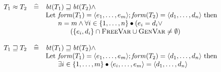 \[
\begin{array}{rcl}
T_1 \approx T_2 & \widehat{=} 
   & \bt(T_1) \sqsupseteq \bt(T_2) \wedge\\
 & & \mathrm{Let}\ \form(T_1) = \langle e_1,\ldots,e_m\rangle;
 \form(T_2) = \langle d_1,\ldots,d_n\rangle\ \mathrm{then} \\
 & & \tab n = m \wedge \forall i \in \{1,\ldots,n\} \bullet (e_i = d_i \vee\\
 & & \tab \tab (\{e_i, d_i\} \cap \freevar \cup \genvar \neq \emptyset)\\
\hlf
T_1 \sqsupseteq T_2 & \widehat{=} 
   & \bt(T_1) \sqsupseteq \bt(T_2) \wedge\\
 & & \mathrm{Let}\ \form(T_1) = \langle e_1,\ldots,e_m\rangle;
     \form(T_2) = \langle d_1,\ldots,d_n\rangle\ \mathrm{then} \\
 & & \tab \exists i \in \{1,\ldots,m\} \bullet \langle e_i,\ldots,e_m\rangle
     = \langle d_1,\ldots,d_n\rangle
\end{array}
\]
